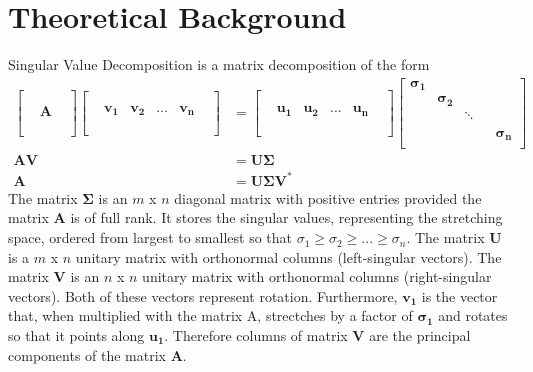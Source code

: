 \documentclass{article}
\begin{document}
\section{Theoretical Background}\label{Theory}
Singular Value Decomposition is a matrix decomposition of the form
\begin{align*}
\begin{bmatrix}
&&\\
&&\\
&\textbf{A}& \\
&&\\
&&\\
\end{bmatrix}
\begin{bmatrix}
&&\\
&&\\
&\mathbf{v_1}& \mathbf{v_2}& \hdots & \mathbf{v_n}&\\
&&\\
&&\\
\end{bmatrix}
&=
\begin{bmatrix}
&&\\
&&\\
&\mathbf{u_1}& \mathbf{u_2}& \hdots & \mathbf{u_n}&\\
&&\\
&&\\
\end{bmatrix}
\begin{bmatrix} 
\mathbf{\sigma_1}&&\\
&\mathbf{\sigma_2}&\\
&& \ddots \\
&&&& \\
&&&&\mathbf{\sigma_n}\\
\end{bmatrix} \\
\mathbf{AV} &= \mathbf{U\Sigma} \\
\mathbf{A} &= \mathbf{U\Sigma V^{*}}
\end{align*}
The matrix $\mathbf{\Sigma}$ is an $m$ x $n$ diagonal matrix with positive entries provided the matrix \textbf{A} is of full rank. It stores the singular values, representing the stretching space, ordered from largest to smallest so that $\sigma_1 \ge \sigma_2 \ge ... \ge \sigma_n$. The matrix \textbf{U} is a $m$ x $n$ unitary matrix with orthonormal columns (left-singular vectors). The matrix \textbf{V} is an $n$ x $n$ unitary matrix with orthonormal columns (right-singular vectors). Both of these vectors represent rotation. Furthermore, $\mathbf{v_1}$ is the vector that, when multiplied with the matrix A, strectches by a factor of $\mathbf{\sigma_1}$ and rotates so that it points along $\mathbf{u_1}$. Therefore columns of matrix \textbf{V} are the principal components of the matrix \textbf{A}. \\
\end{document}
